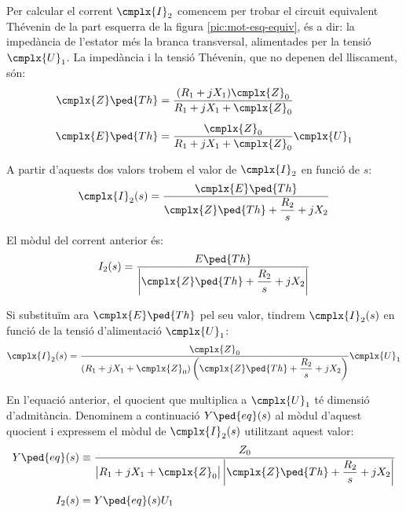 Per calcular el corrent $\cmplx{I}_2$ comencem per trobar el circuit equivalent Thévenin de la part esquerra de la figura \vref{pic:mot-esq-equiv}, és a dir: la impedància de l'estator més la branca transversal, alimentades per la tensió $\cmplx{U}_1$. La impedància i la tensió Thévenin, que no depenen del lliscament, són:
\begin{subequations}
\begin{align}
    \cmplx{Z}\ped{Th} &= \frac{(R_1 + j X_1) \cmplx{Z}_0}{R_1 + j X_1 + \cmplx{Z}_0} \label{eq:mot-ZTh} \\[1ex]
    \cmplx{E}\ped{Th} &= \frac{\cmplx{Z}_0}{R_1 + j X_1 + \cmplx{Z}_0} \cmplx{U}_1 \label{eq:mot-ETh}
\end{align}
\end{subequations}

A partir d'aquests dos valors trobem el valor de $\cmplx{I}_2$ en funció de $s$:
\begin{equation}
    \cmplx{I}_2(s) = \frac{\cmplx{E}\ped{Th}}{\cmplx{Z}\ped{Th} + \dfrac{R_2}{s} + j X_2}
\end{equation}

El mòdul del corrent anterior és:
\begin{equation}
    I_2(s) = \frac{E\ped{Th}}{\left|\cmplx{Z}\ped{Th} + \dfrac{R_2}{s} + j X_2\right|} \label{eq-mot-I2}
\end{equation}

Si substituïm  ara $\cmplx{E}\ped{Th}$ pel seu valor, tindrem $\cmplx{I}_2(s)$ en funció de la tensió d'alimentació $\cmplx{U}_1$:
\begin{equation}
    \cmplx{I}_2(s) = \frac{\cmplx{Z}_0}{(R_1 + j X_1 + \cmplx{Z}_0)\left(\cmplx{Z}\ped{Th} + \dfrac{R_2}{s} + j X_2\right)} \cmplx{U}_1\label{eq:mot-I2}
\end{equation}

En l'equació anterior, el quocient que multiplica a $\cmplx{U}_1$ té dimensió d'admitància. Denominem a continuació $Y\ped{eq}(s)$ al mòdul d'aquest quocient i expressem el mòdul de $\cmplx{I}_2(s)$ utilitzant aquest valor:
\begin{subequations}
\begin{align}
    Y\ped{eq}(s) &\equiv \frac{Z_0}{\big|R_1 + j X_1 + \cmplx{Z}_0\big| \left|\cmplx{Z}\ped{Th} + \dfrac{R_2}{s} + j X_2\right|}\label{eq:mot-Yeq}  \\[1ex]
    I_2(s) &= Y\ped{eq}(s) U_1
\end{align}
\end{subequations}

